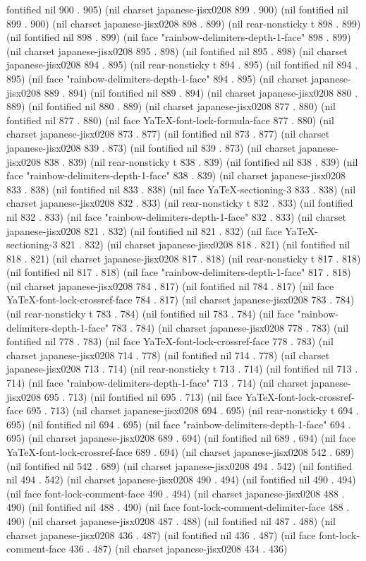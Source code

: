 fontified nil 900 . 905) (nil charset japanese-jisx0208 899 . 900) (nil fontified nil 899 . 900) (nil charset japanese-jisx0208 898 . 899) (nil rear-nonsticky t 898 . 899) (nil fontified nil 898 . 899) (nil face "rainbow-delimiters-depth-1-face" 898 . 899) (nil charset japanese-jisx0208 895 . 898) (nil fontified nil 895 . 898) (nil charset japanese-jisx0208 894 . 895) (nil rear-nonsticky t 894 . 895) (nil fontified nil 894 . 895) (nil face "rainbow-delimiters-depth-1-face" 894 . 895) (nil charset japanese-jisx0208 889 . 894) (nil fontified nil 889 . 894) (nil charset japanese-jisx0208 880 . 889) (nil fontified nil 880 . 889) (nil charset japanese-jisx0208 877 . 880) (nil fontified nil 877 . 880) (nil face YaTeX-font-lock-formula-face 877 . 880) (nil charset japanese-jisx0208 873 . 877) (nil fontified nil 873 . 877) (nil charset japanese-jisx0208 839 . 873) (nil fontified nil 839 . 873) (nil charset japanese-jisx0208 838 . 839) (nil rear-nonsticky t 838 . 839) (nil fontified nil 838 . 839) (nil face "rainbow-delimiters-depth-1-face" 838 . 839) (nil charset japanese-jisx0208 833 . 838) (nil fontified nil 833 . 838) (nil face YaTeX-sectioning-3 833 . 838) (nil charset japanese-jisx0208 832 . 833) (nil rear-nonsticky t 832 . 833) (nil fontified nil 832 . 833) (nil face "rainbow-delimiters-depth-1-face" 832 . 833) (nil charset japanese-jisx0208 821 . 832) (nil fontified nil 821 . 832) (nil face YaTeX-sectioning-3 821 . 832) (nil charset japanese-jisx0208 818 . 821) (nil fontified nil 818 . 821) (nil charset japanese-jisx0208 817 . 818) (nil rear-nonsticky t 817 . 818) (nil fontified nil 817 . 818) (nil face "rainbow-delimiters-depth-1-face" 817 . 818) (nil charset japanese-jisx0208 784 . 817) (nil fontified nil 784 . 817) (nil face YaTeX-font-lock-crossref-face 784 . 817) (nil charset japanese-jisx0208 783 . 784) (nil rear-nonsticky t 783 . 784) (nil fontified nil 783 . 784) (nil face "rainbow-delimiters-depth-1-face" 783 . 784) (nil charset japanese-jisx0208 778 . 783) (nil fontified nil 778 . 783) (nil face YaTeX-font-lock-crossref-face 778 . 783) (nil charset japanese-jisx0208 714 . 778) (nil fontified nil 714 . 778) (nil charset japanese-jisx0208 713 . 714) (nil rear-nonsticky t 713 . 714) (nil fontified nil 713 . 714) (nil face "rainbow-delimiters-depth-1-face" 713 . 714) (nil charset japanese-jisx0208 695 . 713) (nil fontified nil 695 . 713) (nil face YaTeX-font-lock-crossref-face 695 . 713) (nil charset japanese-jisx0208 694 . 695) (nil rear-nonsticky t 694 . 695) (nil fontified nil 694 . 695) (nil face "rainbow-delimiters-depth-1-face" 694 . 695) (nil charset japanese-jisx0208 689 . 694) (nil fontified nil 689 . 694) (nil face YaTeX-font-lock-crossref-face 689 . 694) (nil charset japanese-jisx0208 542 . 689) (nil fontified nil 542 . 689) (nil charset japanese-jisx0208 494 . 542) (nil fontified nil 494 . 542) (nil charset japanese-jisx0208 490 . 494) (nil fontified nil 490 . 494) (nil face font-lock-comment-face 490 . 494) (nil charset japanese-jisx0208 488 . 490) (nil fontified nil 488 . 490) (nil face font-lock-comment-delimiter-face 488 . 490) (nil charset japanese-jisx0208 487 . 488) (nil fontified nil 487 . 488) (nil charset japanese-jisx0208 436 . 487) (nil fontified nil 436 . 487) (nil face font-lock-comment-face 436 . 487) (nil charset japanese-jisx0208 434 . 436) 